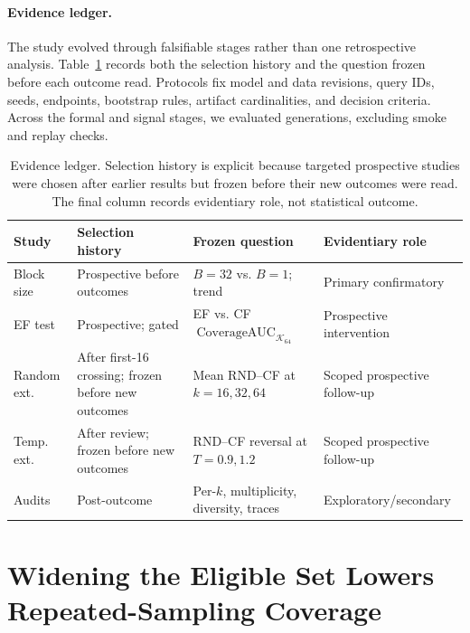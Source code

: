 \documentclass[11pt]{article}
\newcommand{\cauc}{\operatorname{CoverageAUC}}
\begin{document}
\paragraph{Evidence ledger.}
The study evolved through falsifiable stages rather than one retrospective analysis. Table~\ref{tab:ledger} records both the selection history and the question frozen before each outcome read. Protocols fix model and data revisions, query IDs, seeds, endpoints, bootstrap rules, artifact cardinalities, and decision criteria. Across the formal and signal stages, we evaluated \StudyGenerationCount{} generations, excluding smoke and replay checks.

\begin{table}[t]
\caption{Evidence ledger. Selection history is explicit because targeted prospective studies were chosen after earlier results but frozen before their new outcomes were read. The final column records evidentiary role, not statistical outcome.}
\label{tab:ledger}
\centering
\scriptsize
\setlength{\tabcolsep}{2pt}
\begin{tabular}{@{}>{\raggedright\arraybackslash}p{0.9cm}>{\raggedright\arraybackslash}p{1.45cm}>{\raggedright\arraybackslash}p{2.35cm}>{\raggedright\arraybackslash}p{1.65cm}@{}}
\toprule
Study & Selection history & Frozen question & Evidentiary role \\
\midrule
Block size & Prospective before outcomes & $B=32$ vs. $B=1$; trend & Primary confirmatory \\
EF test & Prospective; gated & EF vs. CF $\cauc_{\mathcal K_{64}}$ & Prospective intervention \\
Random ext. & After first-16 crossing; frozen before new outcomes & Mean RND--CF at $k=16,32,64$ & Scoped prospective follow-up \\
Temp. ext. & After review; frozen before new outcomes & RND--CF reversal at $T=0.9,1.2$ & Scoped prospective follow-up \\
Audits & Post-outcome & Per-$k$, multiplicity, diversity, traces & Exploratory/\newline secondary \\
\bottomrule
\end{tabular}
\end{table}

\section{Widening the Eligible Set Lowers Repeated-Sampling Coverage}
\label{sec:block}
\end{document}
